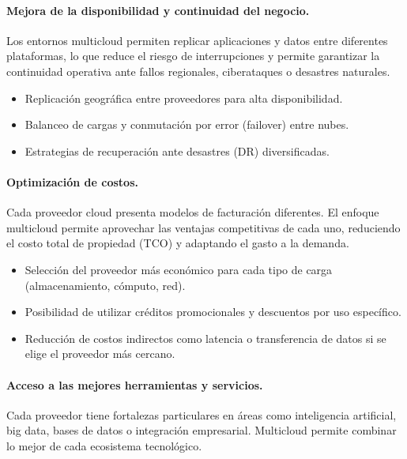 {            \paragraph{Mejora de la disponibilidad y continuidad del negocio.}
            Los entornos multicloud permiten replicar aplicaciones y datos entre diferentes plataformas, lo que reduce el riesgo de interrupciones y permite garantizar la continuidad operativa ante fallos regionales, ciberataques o desastres naturales.
            
            \begin{itemize}
                \item Replicación geográfica entre proveedores para alta disponibilidad.
                \item Balanceo de cargas y conmutación por error (failover) entre nubes.
                \item Estrategias de recuperación ante desastres (DR) diversificadas.
            \end{itemize}
            
            \paragraph{Optimización de costos.}
            Cada proveedor cloud presenta modelos de facturación diferentes. El enfoque multicloud permite aprovechar las ventajas competitivas de cada uno, reduciendo el costo total de propiedad (TCO) y adaptando el gasto a la demanda.
            
            \begin{itemize}
                \item Selección del proveedor más económico para cada tipo de carga (almacenamiento, cómputo, red).
                \item Posibilidad de utilizar créditos promocionales y descuentos por uso específico.
                \item Reducción de costos indirectos como latencia o transferencia de datos si se elige el proveedor más cercano.
            \end{itemize}
            
            \paragraph{Acceso a las mejores herramientas y servicios.} 
            Cada proveedor tiene fortalezas particulares en áreas como inteligencia artificial, big data, bases de datos o integración empresarial. Multicloud permite combinar lo mejor de cada ecosistema tecnológico.
            
}
